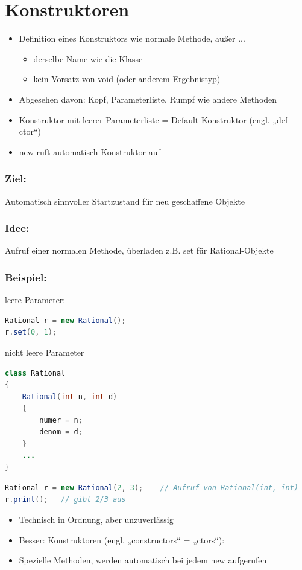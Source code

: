 \section{Konstruktoren}
\begin{itemize}
\item Definition eines Konstruktors wie normale Methode, außer ...
\begin{itemize}
\item derselbe Name wie die Klasse
\item kein Vorsatz von void (oder anderem Ergebnistyp)
\end{itemize}
\item Abgesehen davon: Kopf, Parameterliste, Rumpf wie andere Methoden
\item Konstruktor mit leerer Parameterliste = Default-Konstruktor (engl. „def-ctor“)
\item new ruft automatisch Konstruktor auf
\end{itemize}
\subsubsection{Ziel:}
Automatisch sinnvoller Startzustand für neu geschaffene Objekte
\subsubsection{Idee:}
Aufruf einer normalen Methode, überladen z.B. set für Rational-Objekte
\subsubsection{Beispiel:}
leere Parameter:
\begin{lstlisting}[language=JAVA]
Rational r = new Rational();
r.set(0, 1);
\end{lstlisting}

nicht leere Parameter
\begin{lstlisting}[language=JAVA]
class Rational
{
	Rational(int n, int d)
	{
		numer = n;
		denom = d;
	}
	...
}
\end{lstlisting}
\begin{lstlisting}[language=JAVA]
Rational r = new Rational(2, 3);    // Aufruf von Rational(int, int)
r.print();   // gibt 2/3 aus
\end{lstlisting}
\begin{itemize}
\item Technisch in Ordnung, aber unzuverlässig
\item Besser: Konstruktoren (engl. „constructors“ = „ctors“):
\item Spezielle Methoden, werden automatisch bei jedem new aufgerufen
\end{itemize}

